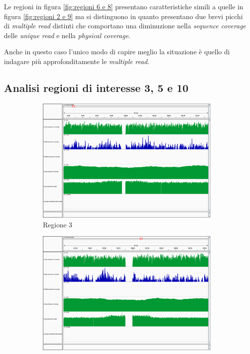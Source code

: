 Le regioni in figura \ref{fig:regioni 6 e 8} presentano caratteristiche simili a quelle in figura \ref{fig:regioni 2 e 9} ma si distinguono in quanto presentano due brevi picchi di \emph{multiple read} distinti che comportano una diminuzione nella \emph{sequence coverage} delle \emph{unique read} e nella \emph{physical coverage}.

Anche in questo caso l'unico modo di capire meglio la situazione è quello di indagare più approfonditamente le \emph{multiple read}.

\subsection{Analisi regioni di interesse 3, 5 e 10}
\begin{figure}[htbp]
	\centering
	\begin{subfigure}[b]{.45\textwidth}
		\includegraphics[width=\textwidth]{immagini/igv_regione3.png}
		\caption{Regione 3}
	\end{subfigure}
	\quad
	\begin{subfigure}[b]{.45\textwidth}
		\includegraphics[width=\textwidth]{immagini/igv_regione5.png}

\end{subfigure}
\end{figure}
